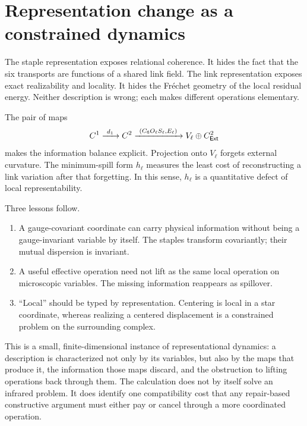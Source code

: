 \section{Representation change as a constrained dynamics}
\label{sec:representation}

The staple representation exposes relational coherence.  It hides the fact
that the six transports are functions of a shared link field.  The link
representation exposes exact realizability and locality.  It hides the
Fr\'echet geometry of the local residual energy.  Neither description is
wrong; each makes different operations elementary.

The pair of maps
\[
 C^1\xrightarrow{\ d_1\ }C^2
 \xrightarrow{\ (C_6O_\ell S_\ell,E_\ell)\ }
 V_\ell\oplus C^2_{\Ext}
\]
makes the information balance explicit.  Projection onto $V_\ell$ forgets
external curvature.  The minimum-spill form $h_\ell$ measures the least cost
of reconstructing a link variation after that forgetting.  In this sense,
$h_\ell$ is a quantitative defect of local representability.

Three lessons follow.

\begin{enumerate}[label=(\roman*)]
\item A gauge-covariant coordinate can carry physical information without
being a gauge-invariant variable by itself.  The staples transform
covariantly; their mutual dispersion is invariant.
\item A useful effective operation need not lift as the same local operation
on microscopic variables.  The missing information reappears as spillover.
\item ``Local'' should be typed by representation.  Centering is local in a
star coordinate, whereas realizing a centered displacement is a constrained
problem on the surrounding complex.
\end{enumerate}

This is a small, finite-dimensional instance of representational dynamics: a
description is characterized not only by its variables, but also by the maps
that produce it, the information those maps discard, and the obstruction to
lifting operations back through them.  The calculation does not by itself
solve an infrared problem.  It does identify one compatibility cost that any
repair-based constructive argument must either pay or cancel through a more
coordinated operation.
